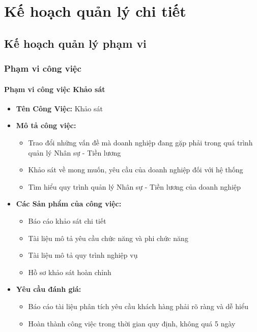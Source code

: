 \chapter{Kế hoạch quản lý chi tiết}
\section{Kế hoạch quản lý phạm vi}
\subsection{Phạm vi công việc}
\subsubsection{Phạm vi công việc Khảo sát}
\begin{itemize}
    \item \textbf{Tên Công Việc:} Khảo sát
    \item \textbf{Mô tả công việc:}
    \begin{itemize}
        \item Trao đổi những vấn đề mà doanh nghiệp đang gặp phải trong quá trình quản lý Nhân sự - Tiền lương
        \item Khảo sát về mong muốn, yêu cầu của doanh nghiệp đối với hệ thống
        \item Tìm hiểu quy trình quản lý Nhân sự - Tiền lương của doanh nghiệp
    \end{itemize}
    \item \textbf{Các Sản phẩm của công việc:}
    \begin{itemize}
        \item Báo cáo khảo sát chi tiết
        \item Tài liệu mô tả yêu cầu chức năng và phi chức năng
        \item Tài liệu mô tả quy trình nghiệp vụ
        \item Hồ sơ khảo sát hoàn chỉnh
    \end{itemize}
    \item \textbf{Yêu cầu đánh giá:}
    \begin{itemize}
        \item Báo cáo tài liệu phân tích yêu cầu khách hàng phải rõ ràng và dễ hiểu
        \item Hoàn thành công việc trong thời gian quy định, không quá 5 ngày
    \end{itemize}
\end{itemize}
